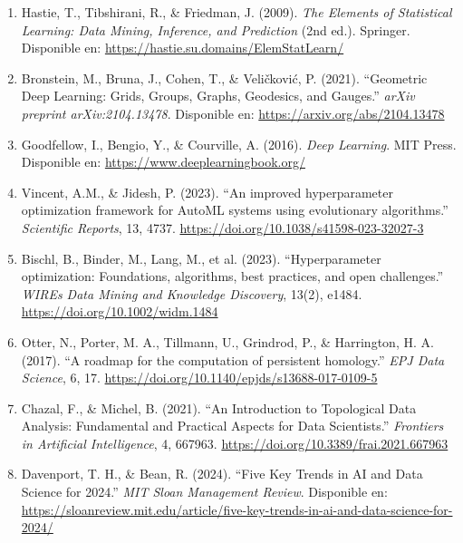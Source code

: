 \documentclass[11pt]{article}
\begin{document}
    \begin{enumerate}
        \item Hastie, T., Tibshirani, R., \& Friedman, J. (2009). \textit{The Elements of Statistical Learning: Data Mining, Inference, and Prediction} (2nd ed.). Springer. Disponible en: \url{https://hastie.su.domains/ElemStatLearn/}

        \item Bronstein, M., Bruna, J., Cohen, T., \& Veli\v{c}kovi\'c, P. (2021). ``Geometric Deep Learning: Grids, Groups, Graphs, Geodesics, and Gauges.'' \textit{arXiv preprint arXiv:2104.13478}. Disponible en: \url{https://arxiv.org/abs/2104.13478}

        \item Goodfellow, I., Bengio, Y., \& Courville, A. (2016). \textit{Deep Learning}. MIT Press. Disponible en: \url{https://www.deeplearningbook.org/}

        \item Vincent, A.M., \& Jidesh, P. (2023). ``An improved hyperparameter optimization framework for AutoML systems using evolutionary algorithms.'' \textit{Scientific Reports}, 13, 4737. \url{https://doi.org/10.1038/s41598-023-32027-3}

        \item Bischl, B., Binder, M., Lang, M., et al. (2023). ``Hyperparameter optimization: Foundations, algorithms, best practices, and open challenges.'' \textit{WIREs Data Mining and Knowledge Discovery}, 13(2), e1484. \url{https://doi.org/10.1002/widm.1484}

        \item Otter, N., Porter, M. A., Tillmann, U., Grindrod, P., \& Harrington, H. A. (2017). ``A roadmap for the computation of persistent homology.'' \textit{EPJ Data Science}, 6, 17. \url{https://doi.org/10.1140/epjds/s13688-017-0109-5}

        \item Chazal, F., \& Michel, B. (2021). ``An Introduction to Topological Data Analysis: Fundamental and Practical Aspects for Data Scientists.'' \textit{Frontiers in Artificial Intelligence}, 4, 667963. \url{https://doi.org/10.3389/frai.2021.667963}

        \item Davenport, T. H., \& Bean, R. (2024). ``Five Key Trends in AI and Data Science for 2024.'' \textit{MIT Sloan Management Review}. Disponible en: \url{https://sloanreview.mit.edu/article/five-key-trends-in-ai-and-data-science-for-2024/}


\end{enumerate}
\end{document}
